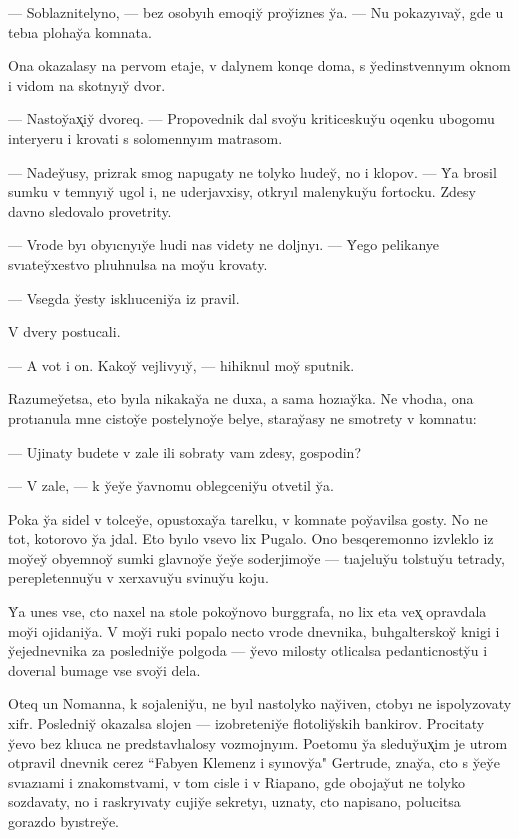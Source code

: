 \documentclass[10pt]{book}
\begin{document}
— Soblaznitelyno, — bez osobyıh emoqiy̆ proy̆iznes y̆a. — Nu pokazyıvay̆, gde u tebıa plohay̆a komnata.

Ona okazalasy na pervom etaje, v dalynem konqe doma, s y̆edinstvennyım oknom i vidom na skotnyıy̆ dvor.

— Nastoy̆ax̨iy̆ dvoreq. — Propovednik dal svoy̆u kriticeskuy̆u oqenku ubogomu interyeru i krovati s solomennyım matrasom.

— Nadey̆usy, prizrak smog napugaty ne tolyko lıudey̆, no i klopov. — Y̆a brosil sumku v temnyıy̆ ugol i, ne uderjavxisy, otkryıl malenykuy̆u fortocku. Zdesy davno sledovalo provetrity.

— Vrode byı obyıcnyıy̆e lıudi nas videty ne doljnyı. — Y̆ego pelikanye svıatey̆xestvo plıuhnulsa na moy̆u krovaty.

— Vsegda y̆esty isklıuceniy̆a iz pravil.

V dvery postucali.

— A vot i on. Kakoy̆ vejlivyıy̆, — hihiknul moy̆ sputnik.

Razumey̆etsa, eto byıla nikakay̆a ne duxa, a sama hozıay̆ka. Ne vhodıa, ona protıanula mne cistoy̆e postelynoy̆e belye, staray̆asy ne smotrety v komnatu:

— Ujinaty budete v zale ili sobraty vam zdesy, gospodin?

— V zale, — k y̆ey̆e y̆avnomu oblegceniy̆u otvetil y̆a.

Poka y̆a sidel v tolcey̆e, opustoxay̆a tarelku, v komnate poy̆avilsa gosty. No ne tot, kotorovo y̆a jdal. Eto byılo vsevo lix Pugalo. Ono besqeremonno izvleklo iz moy̆ey̆ obyemnoy̆ sumki glavnoy̆e y̆ey̆e soderjimoy̆e — tıajeluy̆u tolstuy̆u tetrady, perepletennuy̆u v xerxavuy̆u svinuy̆u koju.

Y̆a unes vse, cto naxel na stole pokoy̆novo burggrafa, no lix eta vex̨ opravdala moy̆i ojidaniy̆a. V moy̆i ruki popalo necto vrode dnevnika, buhgalterskoy̆ knigi i y̆ejednevnika za posledniy̆e polgoda — y̆evo milosty otlicalsa pedanticnosty̆u i doverıal bumage vse svoy̆i dela.

Oteq un Nomanna, k sojaleniy̆u, ne byıl nastolyko nay̆iven, ctobyı ne ispolyzovaty xifr. Posledniy̆ okazalsa slojen — izobreteniy̆e flotoliy̆skih bankirov. Procitaty y̆evo bez klıuca ne predstavlıalosy vozmojnyım. Poetomu y̆a sleduy̆ux̨im je utrom otpravil dnevnik cerez ``Fabyen Klemenz i syınovy̆a" Gertrude, znay̆a, cto s y̆ey̆e svıazıami i znakomstvami, v tom cisle i v Riapano, gde obojay̆ut ne tolyko sozdavaty, no i raskryıvaty cujiy̆e sekretyı, uznaty, cto napisano, polucitsa gorazdo byıstrey̆e.
\end{document}
